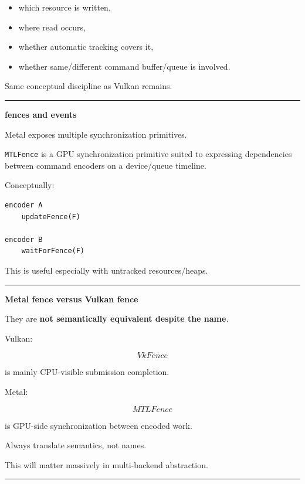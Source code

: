 \begin{itemize}
\tightlist
\item
  which resource is written,
\item
  where read occurs,
\item
  whether automatic tracking covers it,
\item
  whether same/different command buffer/queue is involved.
\end{itemize}

Same conceptual discipline as Vulkan remains.

\begin{center}\rule{0.5\linewidth}{0.5pt}\end{center}

\textbf{fences and events}

Metal exposes multiple synchronization primitives.

\texttt{MTLFence} is a GPU synchronization primitive suited to expressing dependencies between command encoders on a device/queue timeline.

Conceptually:

\begin{verbatim}
encoder A
    updateFence(F)

encoder B
    waitForFence(F)
\end{verbatim}

This is useful especially with untracked resources/heaps.

\begin{center}\rule{0.5\linewidth}{0.5pt}\end{center}

\textbf{Metal fence versus Vulkan fence}

They are \textbf{not semantically equivalent despite the name}.

Vulkan:

\[
VkFence
\]

is mainly CPU-visible submission completion.

Metal:

\[
MTLFence
\]

is GPU-side synchronization between encoded work.

Always translate semantics, not names.

This will matter massively in multi-backend abstraction.

\begin{center}\rule{0.5\linewidth}{0.5pt}\end{center}

